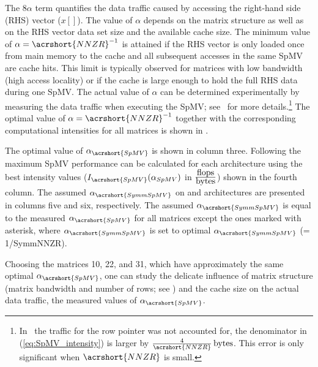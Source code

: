 The $8\alpha$ term quantifies the data traffic caused by accessing the
right-hand side (RHS) vector ($x[]$). The value of $\alpha$ depends on
the matrix structure as well as on the RHS vector data set size and
the available cache size. The minimum value of
$\alpha=\acrshort{NNZR}^{-1}$ is attained if the RHS vector is only
loaded once from main memory to the cache and all subsequent accesses
in the same \acrshort{SpMV} are cache hits. This limit is typically
observed for matrices with low bandwidth (high access locality) or if
the cache is large enough to hold the full RHS data during
one \acrshort{SpMV}. The actual value of $\alpha$ can be determined
experimentally by measuring the data traffic when executing
the \acrshort{SpMV}; see~\cite{Moritz_sell} for more
details.\footnote{In~\cite{Moritz_sell} the traffic for the row
pointer was not accounted for, \ie the denominator in
(\ref{eq:SpMV_intensity}) is larger by
$\frac{4}{\acrshort{NNZR}}\,\BYTE$. This error is only significant
when $\acrshort{NNZR}$ is small.}  The optimal value of
$\alpha=\acrshort{NNZR}^{-1}$ together with the corresponding
computational intensities for all matrices is shown in 
. 
\begin{table}[t]
	\centering
	\caption{The optimal value of $\alpha_{\acrshort{SpMV}}$
	is shown in column three. Following  the
	maximum \acrshort{SpMV} performance can be calculated for each
	architecture using the best intensity values
	($I_{\acrshort{SpMV}}(\alpha_{SpMV})$ in
	$\frac{\mbox{flops}}{\mbox{bytes}}$) shown in the fourth
	column. The assumed $\alpha_{\acrshort{SymmSpMV}}$ on \SKX and 
	\IVB architectures are presented in columns five and six, respectively.
	The assumed $\alpha_{\acrshort{SymmSpMV}}$ is equal to 
	the measured $\alpha_{\acrshort{SpMV}}$ for all matrices
	except the ones marked with asterisk, where  $\alpha_{\acrshort{SymmSpMV}}$
	is set to optimal $\alpha_{\acrshort{SymmSpMV}}$ (= 1/\acrshort{SymmNNZR}).
	 \label{table:alpha_values}}
    \begin{center} 
      
    \end{center}
\end{table}
Choosing the matrices 10, 22, and 31, which have approximately the
same optimal $\alpha_{\acrshort{SpMV}}$, one can study the delicate
influence of matrix structure (\ie matrix bandwidth and number of
rows; see ) and the cache size on the actual data
traffic, \ie the measured values of $\alpha_{\acrshort{SpMV}}$.
 
